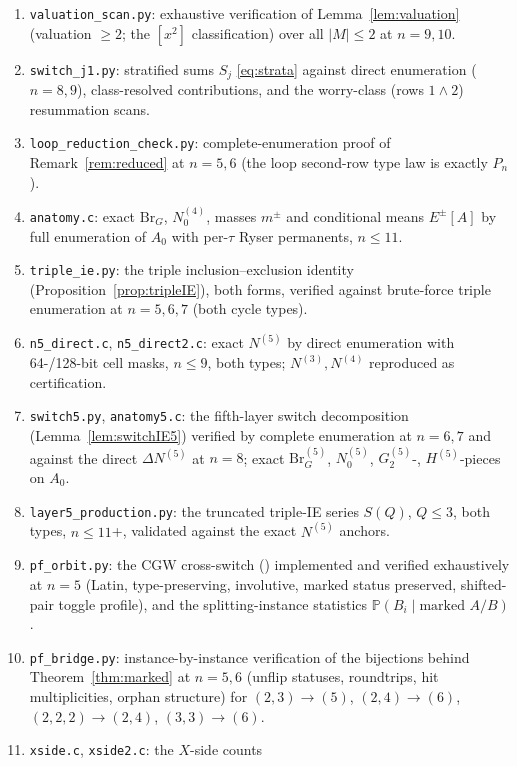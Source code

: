 \documentclass[11pt]{article}
\theoremstyle{definition}
\renewcommand{\Pr}{\mathbb{P}}
\newcommand{\PP}{P}
\begin{document}
\begin{enumerate}[leftmargin=2em]
formula \eqref{eq:generic} on random punctures at $n=9,11,13$.
\item \texttt{valuation\_scan.py}: exhaustive verification of
Lemma~\ref{lem:valuation} (valuation $\ge2$; the $[x^2]$
classification) over all $|M|\le2$ at $n=9,10$.
\item \texttt{switch\_j1.py}: stratified sums $S_j$ \eqref{eq:strata}
against direct enumeration ($n=8,9$), class-resolved contributions,
and the worry-class (rows $1\wedge2$) resummation scans.
\item \texttt{loop\_reduction\_check.py}: complete-enumeration proof of
Remark~\ref{rem:reduced} at $n=5,6$ (the loop second-row type law is
exactly $\PP_n$).
\item \texttt{anatomy.c}: exact $\mathrm{Br}_G$, $N^{(4)}_0$, masses
$m^\pm$ and conditional means $E^\pm[A]$ by full enumeration of $A_0$
with per-$\tau$ Ryser permanents, $n\le11$.
\item \texttt{triple\_ie.py}: the triple inclusion--exclusion identity
(Proposition~\ref{prop:tripleIE}), both forms, verified against
brute-force triple enumeration at $n=5,6,7$ (both cycle types).
\item \texttt{n5\_direct.c}, \texttt{n5\_direct2.c}: exact $N^{(5)}$ by
direct enumeration with 64-/128-bit cell masks, $n\le9$, both types;
$N^{(3)},N^{(4)}$ reproduced as certification.
\item \texttt{switch5.py}, \texttt{anatomy5.c}: the fifth-layer switch
decomposition (Lemma~\ref{lem:switchIE5}) verified by complete
enumeration at $n=6,7$ and against the direct $\Delta N^{(5)}$ at
$n=8$; exact $\mathrm{Br}^{(5)}_G$, $N^{(5)}_0$, $G_2^{(5)}$-,
$H^{(5)}$-pieces on $A_0$.
\item \texttt{layer5\_production.py}: the truncated triple-IE series
$S(Q)$, $Q\le3$, both types, $n\le11$+, validated against the exact
$N^{(5)}$ anchors.
\item \texttt{pf\_orbit.py}: the CGW cross-switch
(\cite[Def.~3.9]{CGW08}) implemented and verified exhaustively at
$n=5$ (Latin, type-preserving, involutive, marked status preserved,
shifted-pair toggle profile), and the splitting-instance statistics
$\Pr(B_i\mid\text{marked }A/B)$.
\item \texttt{pf\_bridge.py}: instance-by-instance verification of the
bijections behind Theorem~\ref{thm:marked} at $n=5,6$ (unflip
statuses, roundtrips, hit multiplicities, orphan structure) for
$(2,3)\to(5)$, $(2,4)\to(6)$, $(2,2,2)\to(2,4)$, $(3,3)\to(6)$.
\item \texttt{xside.c}, \texttt{xside2.c}: the $X$-side counts

\end{enumerate}
\end{document}
